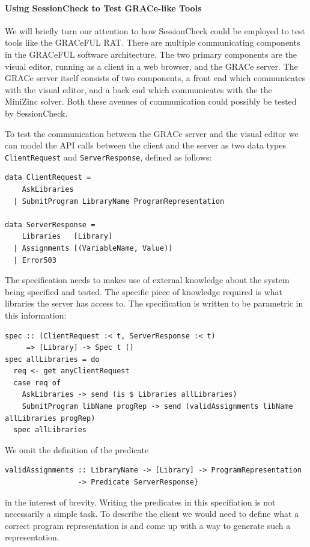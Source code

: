 \documentclass{article}
\begin{document}
\paragraph{Using SessionCheck to Test GRACe-like Tools}

We will briefly turn our attention to how SessionCheck could be employed
to test tools like the GRACeFUL RAT.
%
There are multiple communicating components in the GRACeFUL software architecture.
%
The two primary components are the visual editor, running as a client in a web browser,
and the GRACe server.
%
The GRACe server itself consists of two components, a front end which communicates with
the visual editor, and a back end which communicates with the the MiniZinc solver.
%
Both these avenues of communication could possibly be tested by SessionCheck.
%

To test the communication between the GRACe server and the visual editor we can model
the API calls between the client and the server as
two data types \texttt{ClientRequest} and
\texttt{ServerResponse}, defined as follows:
%
\begin{verbatim}
data ClientRequest =
    AskLibraries
  | SubmitProgram LibraryName ProgramRepresentation

data ServerResponse =
    Libraries   [Library]
  | Assignments [(VariableName, Value)]
  | Error503
\end{verbatim}

The specification needs to makes use of external knowledge about the system
being specified and tested.
%
The specific piece of knowledge required is what libraries the server has access
to.
%
The specification is written to be parametric in this information:

\begin{verbatim}
spec :: (ClientRequest :< t, ServerResponse :< t)
     => [Library] -> Spec t ()
spec allLibraries = do
  req <- get anyClientRequest
  case req of
    AskLibraries -> send (is $ Libraries allLibraries)
    SubmitProgram libName progRep -> send (validAssignments libName allLibraries progRep)
  spec allLibraries
\end{verbatim}

We omit the definition of the predicate
\begin{verbatim}
validAssignments :: LibraryName -> [Library] -> ProgramRepresentation 
                 -> Predicate ServerResponse}
\end{verbatim}
in the interest of brevity.
%
Writing the predicates in this specifiation is not necessarily a simple task.
%
To describe the client we would need to define what a correct program representation is
and come up with a way to generate such a representation.
\end{document}
